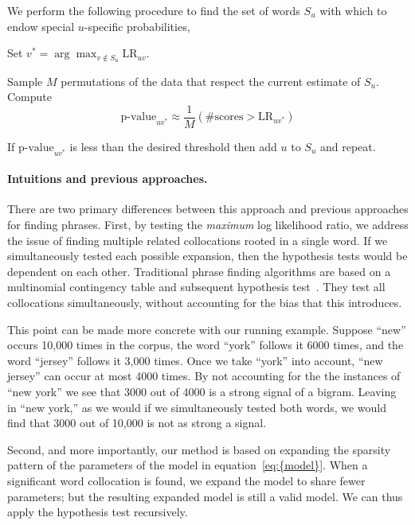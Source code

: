 \documentclass[11pt]{article}
\newenvironment{packed_enumerate}{
  \begin{enumerate}
    \setlength{\topsep}{0pt}
    \setlength{\itemsep}{6pt}
    \setlength{\parskip}{0pt}
    \setlength{\parsep}{0pt}
}\end{enumerate}
\begin{document}
We perform the following procedure to find the set of words $S_u$ with
which to endow special $u$-specific probabilities,
\begin{packed_enumerate}
\item Set $v^* = \arg \max_{v \notin S_u} {\textrm{LR}}_{uv}$.
\item Sample $M$ permutations of the data that respect the current
  estimate of $S_u$.  Compute
  \begin{equation*}
    \textrm{p-value}_{uv^*} \approx
    \frac{1}{M} \left(\textrm{\# scores} > {\textrm{LR}}_{uv^{*}}\right)
  \end{equation*}
\item If $\textrm{p-value}_{uv^{*}}$ is less than the desired
  threshold then add $u$ to $S_u$ and repeat.
\end{packed_enumerate}

\paragraph{Intuitions and previous approaches.}

There are two primary differences between this approach and previous
approaches for finding phrases.  First, by testing the
\textit{maximum} log likelihood ratio, we address the issue of finding
multiple related collocations rooted in a single word.  If we
simultaneously tested each possible expansion, then the hypothesis
tests would be dependent on each other.  Traditional phrase finding
algorithms are based on a multinomial contingency table and subsequent
hypothesis test~\citep{Manning:1999}.  They test all collocations
simultaneously, without accounting for the bias that this introduces.

This point can be made more concrete with our running example.  Suppose
``new'' occurs 10,000 times in the corpus, the word ``york'' follows
it 6000 times, and the word ``jersey'' follows it 3,000 times.  Once we
take ``york'' into account, ``new jersey'' can occur at most 4000
times.  By not accounting for the the instances of ``new york'' we see
that 3000 out of 4000 is a strong signal of a bigram.  Leaving in
``new york,'' as we would if we simultaneously tested both words, we
would find that 3000 out of 10,000 is not as strong a signal.

Second, and more importantly, our method is based on expanding the
sparsity pattern of the parameters of the model in {equation~\eqref{eq:{model}}}.  When
a significant word collocation is found, we expand the model to share
fewer parameters; but the resulting expanded model is still a valid
model.  We can thus apply the hypothesis test recursively.
\end{document}
